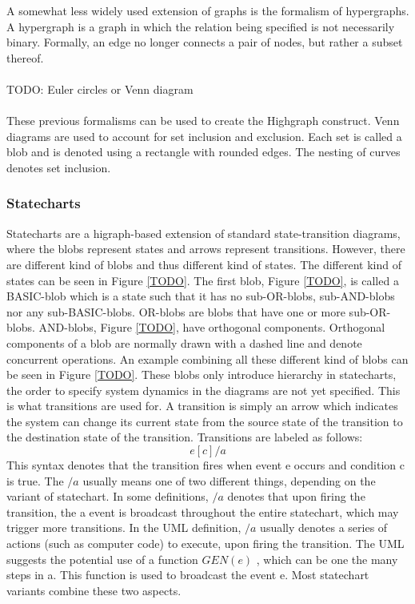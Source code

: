 A somewhat less widely used extension of graphs is the formalism of hypergraphs. A hypergraph is a graph in which the 
relation being specified is not necessarily binary. Formally, an edge no longer connects a pair of nodes, but rather a 
subset thereof.
\\
\\
TODO: Euler circles or Venn diagram
\\
\\
These previous formalisms can be used to create the Highgraph construct. Venn diagrams are used to account for set 
inclusion and exclusion. Each set is called a blob and is denoted using a rectangle with rounded edges. The nesting of 
curves denotes set inclusion.





\subsubsection{Statecharts}
Statecharts are a higraph-based extension of standard state-transition diagrams, where the blobs represent states and 
arrows represent transitions. However, there are different kind of blobs and thus different kind of states. The 
different kind of states can be seen in Figure \ref{TODO}. The first blob, Figure \ref{TODO}, is called a BASIC-blob 
which is a state such that it has no sub-OR-blobs, sub-AND-blobs nor any sub-BASIC-blobs. OR-blobs are blobs that have 
one or more sub-OR-blobs. AND-blobs, Figure \ref{TODO}, have orthogonal components. Orthogonal components of a blob are 
normally drawn with a dashed line and denote concurrent operations. An example combining all these different kind of 
blobs can be seen in Figure \ref{TODO}. These blobs only introduce hierarchy in statecharts, the order to specify system 
dynamics in the diagrams are not yet specified. This is what transitions are used for. A transition is simply an arrow 
which indicates the system can change its current state from the source state of the transition to the destination state 
of the transition. Transitions are labeled as follows:
\begin{equation}
    e [c]/a
\end{equation}
This syntax denotes that the transition fires when event e occurs and condition c is true. The $/a$ usually means one of 
two different things, depending on the variant of statechart. In some definitions, $/a$ denotes that upon firing the 
transition, the a event is broadcast throughout the entire statechart, which may trigger more transitions. In the UML 
definition, $/a$ usually denotes a series of actions (such as computer code) to execute, upon firing the transition. The 
UML suggests the potential use of a function $GEN(e)$ , which can be one the many steps in a. This function is used to 
broadcast the event e. Most statechart variants combine these two aspects.

